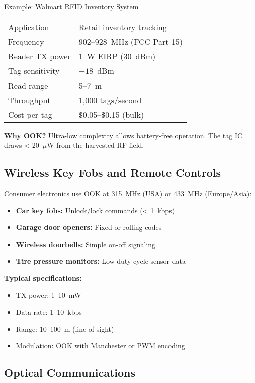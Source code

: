 \begin{calloutbox}[colback=black!5!white,colframe=black]{Example: Walmart RFID Inventory System}
\begin{tabular}{@{}ll@{}}
Application & Retail inventory tracking \\
Frequency & 902--928~MHz (FCC Part 15) \\
Reader TX power & 1~W EIRP (30~dBm) \\
Tag sensitivity & $-18$~dBm \\
Read range & 5--7~m \\
Throughput & 1,000 tags/second \\
Cost per tag & \$0.05--\$0.15 (bulk) \\
\end{tabular}

\vspace{0.3cm}
\textbf{Why OOK?} Ultra-low complexity allows battery-free operation. The tag IC draws < 20~$\mu$W from the harvested RF field.
\end{calloutbox}

\subsection{Wireless Key Fobs and Remote Controls}

Consumer electronics use OOK at 315~MHz (USA) or 433~MHz (Europe/Asia):

\begin{itemize}
\item \textbf{Car key fobs:} Unlock/lock commands (< 1~kbps)
\item \textbf{Garage door openers:} Fixed or rolling codes
\item \textbf{Wireless doorbells:} Simple on-off signaling
\item \textbf{Tire pressure monitors:} Low-duty-cycle sensor data
\end{itemize}

\textbf{Typical specifications:}
\begin{itemize}
\item TX power: 1--10~mW
\item Data rate: 1--10~kbps
\item Range: 10--100~m (line of sight)
\item Modulation: OOK with Manchester or PWM encoding
\end{itemize}

\subsection{Optical Communications}

